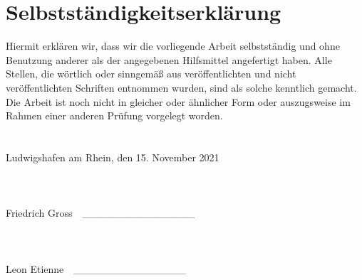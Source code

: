 %
%

\chapter*{Selbstständigkeitserklärung}

Hiermit erklären wir, dass wir die vorliegende Arbeit selbstständig und ohne Benutzung anderer als der angegebenen Hilfsmittel angefertigt haben.
Alle Stellen, die wörtlich oder sinngemäß aus veröffentlichten und nicht veröffentlichten Schriften
entnommen wurden, sind als solche kenntlich gemacht. Die Arbeit ist noch nicht in
gleicher oder ähnlicher Form oder auszugsweise im Rahmen einer anderen Prüfung
vorgelegt worden.
\\
\\
\\
\hspace*{\fill}Ludwigshafen am Rhein, den 15. November 2021
\\
\\
\\
\\
\hspace*{\fill}Friedrich Gross\ \ \_\_\_\_\_\_\_\_\_\_\_\_\_\_\_
\\
\\
\\
\\
\hspace*{\fill}Leon Etienne\ \ \_\_\_\_\_\_\_\_\_\_\_\_\_\_\_
